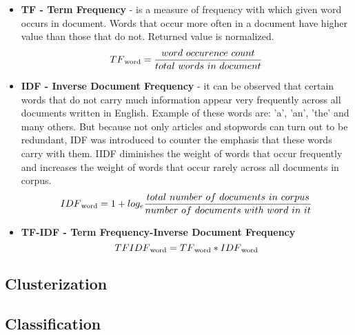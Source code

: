 \begin{itemize}
	\item \textbf{TF - Term Frequency} - is a measure of frequency with which given word occurs in document. Words that occur more often in a document have higher value than those that do not. Returned value is normalized.
	\[TF\textsubscript{word}=\frac{word\ occurence\ count}{total\ words\ in\ document}\]
	\item \textbf{IDF - Inverse Document Frequency} - it can be observed that certain words that do not carry much information appear very frequently across all documents written in English. Example of these words are: 'a', 'an', 'the' and many others. But because not only articles and stopwords can turn out to be redundant, IDF was introduced to counter the emphasis that these words carry with them. IIDF diminishes the weight of words that occur frequently and increases the weight of words that occur rarely across all documents in corpus.
	\[IDF\textsubscript{word}=1+log_e \frac{total\ number\ of\ documents\ in\ corpus}{number\ of\ documents\ with\ word\ in\ it}\]
	\item \textbf{TF-IDF - Term Frequency-Inverse Document Frequency}
	\[TFIDF\textsubscript{word}=TF\textsubscript{word} * IDF\textsubscript{word}\]
\end{itemize}

\subsection{Clusterization}
\subsection{Classification}